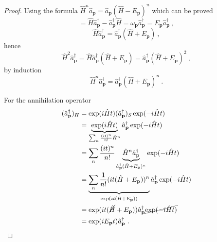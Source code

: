\begin{proof}
        Using the formula $\hat H^n \hat a_{\mathbf p} = \hat a_{\mathbf p} (\hat H - E_{\mathbf p})^n$ which can be proved 
        \begin{equation*}
            [\hat H, \hat a^\dagger_{\mathbf p}] = \hat H \hat a^\dagger_{\mathbf p} - \hat a^\dagger_{\mathbf p} \hat H = \omega_{\mathbf p} \hat a^\dagger_{\mathbf p} = E_{\mathbf p} \hat a^\dagger_{\mathbf p} ~,
        \end{equation*}
        \begin{equation*}
            \hat H \hat a^\dagger_{\mathbf p} = \hat a^\dagger_{\mathbf p} (\hat H + E_{\mathbf p}) ~,
        \end{equation*}
        hence 
        \begin{equation}
            \hat H^2 \hat a^\dagger_{\mathbf p} = \hat H \hat a^\dagger_{\mathbf p} (\hat H + E_{\mathbf p}) = \hat a^\dagger_{\mathbf p} (\hat H + E_{\mathbf p})^2 ~,
        \end{equation}
        by induction 
        \begin{equation*}
            \hat H^n \hat a^\dagger_{\mathbf p} = \hat a^\dagger_{\mathbf p} (\hat H + E_{\mathbf p})^n ~.
        \end{equation*}

        For the annihilation operator 
        \begin{equation*}
        \begin{aligned}
            (\hat a^\dagger_{\mathbf p})_H & = \exp(i \hat H t) (\hat a^\dagger_{\mathbf p})_S \exp(- i \hat H t) \\ & = \underbrace{\exp(i \hat H t)}_{\sum_n \frac{(i t)^n}{n!} \hat H^n} \hat a^\dagger_{\mathbf p} \exp(- i \hat H t) \\ & = \sum_n \frac{(i t)^n}{n!} \underbrace{\hat H^n \hat a^\dagger_{\mathbf p}}_{\hat a^\dagger_{\mathbf p} (\hat H + E_{\mathbf p})^n} \exp(- i \hat H t) \\ & = \underbrace{\sum_n \frac{1}{n!}  (i t (\hat H + E_{\mathbf p}))^n }_{\exp(i t (\hat H + E_{\mathbf p}))}  \hat a^\dagger_{\mathbf p} \exp(- i \hat H t) \\ & = \exp(i t (\cancel{\hat H} + E_{\mathbf p})) \hat a^\dagger_{\mathbf p} \cancel{\exp(- i \hat H t)} \\ & = \exp(i E_{\mathbf p} t) \hat a^\dagger_{\mathbf p} ~.
        \end{aligned}
        \end{equation*}
    \end{proof}

